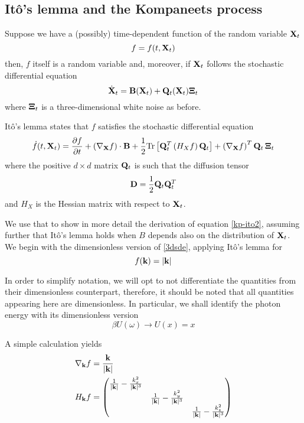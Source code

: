 \documentclass[a4paper,12pt,reqno,superscriptaddress,nofootinbib]{revtex4}
\theoremstyle{plain}
\theoremstyle{definition}
\theoremstyle{remark}
\newcommand{\0}{^{(0)}}
\newcommand{\1}{^{(1)}}
\newcommand{\2}{^{(2)}}
\begin{document}
 
\begin{appendix}

\section{It\^o's lemma and the Kompaneets process}\label{itoder}

Suppose we have a (possibly) time-dependent function of the random variable $\vb{X}_t$
\[f=f(t,\vb{X}_t) \]
then, $f$ itself is a random variable and, moreover, if $\vb{X}_t$ follows the stochastic differential equation \begin{equation*}
	\dot{\vb{X}}_t=\vb{B}(\vb{X}_t) + \vb{Q}_t(\vb{X}_t)\vb{\Xi}_t
\end{equation*}
where $\vb{\Xi}_t$ is a three-dimensional white noise as before.

Itô's lemma \cite{itolemma} states that $f$ satisfies the stochastic differential equation
\begin{equation}\label{ilem}
	\dot{f} (t, \vb{X}_t)= \frac{\partial f}{\partial t}+ \left(\nabla_{\vb{X}}f\right)\cdot\vb{B} +\frac{1}{2}\mathrm{Tr}\left[\vb{Q}^T_t\left(H_Xf\right)\vb{Q}_t\right] + \left(\nabla_{\vb{X}}f\right)^T\vb{Q}_t\, \vb{\Xi}_t
\end{equation}
where the positive $d\times d$ matrix $\vb{Q}_t$ is such that the diffusion tensor
\[\vb{D}=\frac{1}{2}\vb{Q}_t\vb{Q}^T_t\]
and $H_X$ is the Hessian matrix with respect to $\vb{X}_t$. 


We use that to show in more detail the derivation of equation \eqref{kp-ito2}, assuming further that Itô's lemma holds when $B$ depends also on the distribution of $\vb{X}_t$.  We begin with the dimensionless version of \eqref{3dsde}, applying Itô's lemma for 
\[f(\vb{k})=|\vb{k}|\]

In order to simplify notation, we will opt to not differentiate the quantities from their dimensionless counterpart, therefore, it should be noted that all quantities appearing here are dimensionless. In particular, we shall identify the photon energy with its dimensionless version
\[\beta U (\omega) \to U(x)=x\]

A simple calculation yields
\begin{align*}
	&\nabla_{\vb{k}}f =  \frac{\vb{k}}{|\vb{k}|}\\
	&H_{\vb{k}}f = 
	\begin{pmatrix}
		\frac{1}{|\vb{k}|}	-\frac{k_x^2}{|\vb{k}|^3} & & \\
		&\frac{1}{|\vb{k}|} -\frac{k_y^2}{|\vb{k}|^3}  &\\
		& & \frac{1}{|\vb{k}|}- \frac{k_z^2}{|\vb{k}|^3}
	\end{pmatrix}
\end{align*}


\end{appendix}
\end{document}

